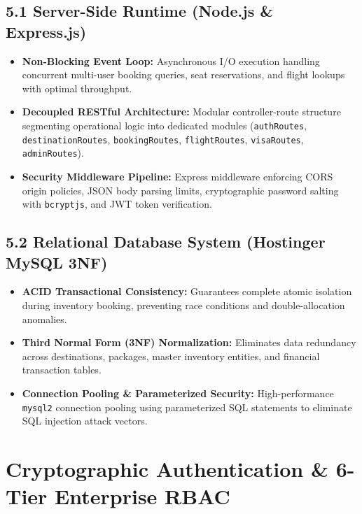 \documentclass[11pt,a4paper]{article}
\begin{document}
\subsection{5.1 Server-Side Runtime (Node.js \& Express.js)}
\begin{itemize}[leftmargin=*]
    \item \textbf{Non-Blocking Event Loop:} Asynchronous I/O execution handling concurrent multi-user booking queries, seat reservations, and flight lookups with optimal throughput.
    \item \textbf{Decoupled RESTful Architecture:} Modular controller-route structure segmenting operational logic into dedicated modules (\texttt{authRoutes}, \texttt{destinationRoutes}, \texttt{bookingRoutes}, \texttt{flightRoutes}, \texttt{visaRoutes}, \texttt{adminRoutes}).
    \item \textbf{Security Middleware Pipeline:} Express middleware enforcing CORS origin policies, JSON body parsing limits, cryptographic password salting with \texttt{bcryptjs}, and JWT token verification.
\end{itemize}

\subsection{5.2 Relational Database System (Hostinger MySQL 3NF)}
\begin{itemize}[leftmargin=*]
    \item \textbf{ACID Transactional Consistency:} Guarantees complete atomic isolation during inventory booking, preventing race conditions and double-allocation anomalies.
    \item \textbf{Third Normal Form (3NF) Normalization:} Eliminates data redundancy across destinations, packages, master inventory entities, and financial transaction tables.
    \item \textbf{Connection Pooling \& Parameterized Security:} High-performance \texttt{mysql2} connection pooling using parameterized SQL statements to eliminate SQL injection attack vectors.
\end{itemize}

\newpage

\section{Cryptographic Authentication \& 6-Tier Enterprise RBAC}
\end{document}
